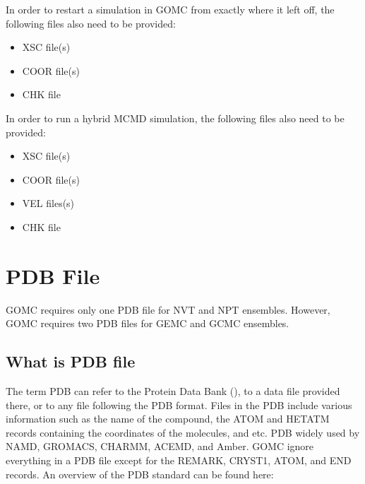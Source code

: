 \documentclass[letterpaper,10pt,english]{sphinxmanual}
\begin{document}
\sphinxAtStartPar
In order to restart a simulation in GOMC from exactly where it left off, the following files also need to be provided:
\begin{itemize}
\item {} 
\sphinxAtStartPar
XSC file(s)

\item {} 
\sphinxAtStartPar
COOR file(s)

\item {} 
\sphinxAtStartPar
CHK file

\end{itemize}

\sphinxAtStartPar
In order to run a hybrid MCMD simulation, the following files also need to be provided:
\begin{itemize}
\item {} 
\sphinxAtStartPar
XSC file(s)

\item {} 
\sphinxAtStartPar
COOR file(s)

\item {} 
\sphinxAtStartPar
VEL files(s)

\item {} 
\sphinxAtStartPar
CHK file

\end{itemize}


\section{PDB File}
\label{\detokenize{input_file:pdb-file}}
\sphinxAtStartPar
GOMC requires only one PDB file for NVT and NPT ensembles. However, GOMC requires two PDB files for GEMC and GCMC ensembles.


\subsection{What is PDB file}
\label{\detokenize{input_file:what-is-pdb-file}}
\sphinxAtStartPar
The term PDB can refer to the Protein Data Bank (), to a data file provided there, or to any file following the PDB format.
Files in the PDB include various information such as the name of the compound, the ATOM and HETATM records containing the coordinates of the molecules, and etc.
PDB widely used by NAMD, GROMACS, CHARMM, ACEMD, and Amber. GOMC ignore everything in a PDB file except for the REMARK, CRYST1, ATOM, and END records.
An overview of the PDB standard can be found here:
\end{document}
